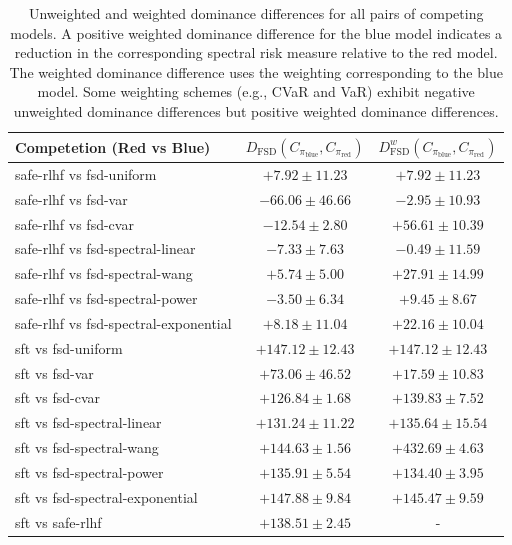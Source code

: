 \begin{table}[t]
  \centering
  {\footnotesize
    \begin{tabular}{lcc}
      \toprule
      Competetion (Red vs Blue) & $D_{\textrm{FSD}}(C_{\pi_{\textrm{blue}}}, C_{\pi_{\textrm{red}}})$ & $D_{\textrm{FSD}}^{w}(C_{\pi_{\textrm{blue}}}, C_{\pi_{\textrm{red}}})$ \\
      \midrule
      safe-rlhf vs fsd-uniform & $+7.92 \pm 11.23$ & \underline{\textbf{$+7.92 \pm 11.23$}} \\
      safe-rlhf vs fsd-var & $-66.06 \pm 46.66$ & $-2.95 \pm 10.93$ \\
      safe-rlhf vs fsd-cvar & $-12.54 \pm 2.80$ & \underline{\textbf{$+56.61 \pm 10.39$}} \\
      safe-rlhf vs fsd-spectral-linear & $-7.33 \pm 7.63$ & $-0.49 \pm 11.59$ \\
      safe-rlhf vs fsd-spectral-wang & $+5.74 \pm 5.00$ & \underline{\textbf{$+27.91 \pm 14.99$}} \\
      safe-rlhf vs fsd-spectral-power & $-3.50 \pm 6.34$ & \underline{\textbf{$+9.45 \pm 8.67$}} \\
      safe-rlhf vs fsd-spectral-exponential & $+8.18 \pm 11.04$ & \underline{\textbf{$+22.16 \pm 10.04$}} \\
      \midrule
      sft vs fsd-uniform & $+147.12 \pm 12.43$ & \underline{\textbf{$+147.12 \pm 12.43$}} \\
      sft vs fsd-var & $+73.06 \pm 46.52$ & \underline{\textbf{$+17.59 \pm 10.83$}} \\
      sft vs fsd-cvar & $+126.84 \pm 1.68$ & \underline{\textbf{$+139.83 \pm 7.52$}} \\
      sft vs fsd-spectral-linear & $+131.24 \pm 11.22$ & \underline{\textbf{$+135.64 \pm 15.54$}} \\
      sft vs fsd-spectral-wang & $+144.63 \pm 1.56$ & \underline{\textbf{$+432.69 \pm 4.63$}} \\
      sft vs fsd-spectral-power & $+135.91 \pm 5.54$ & \underline{\textbf{$+134.40 \pm 3.95$}} \\
      sft vs fsd-spectral-exponential & $+147.88 \pm 9.84$ & \underline{\textbf{$+145.47 \pm 9.59$}} \\
      \midrule
      sft vs safe-rlhf & $+138.51 \pm 2.45$ & - \\
      \bottomrule
    \end{tabular}
  }
  \caption{
    Unweighted and weighted dominance differences for all pairs of competing models.
    A positive weighted dominance difference for the blue model indicates a reduction in the corresponding spectral risk measure relative to the red model. The weighted dominance difference uses the weighting corresponding to the blue model. Some weighting schemes (e.g., CVaR and VaR) exhibit negative unweighted dominance differences but positive weighted dominance differences.
}
\end{table}
